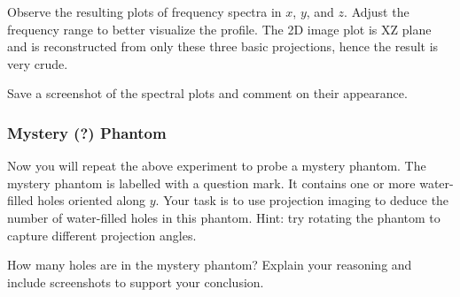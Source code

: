 Observe the resulting plots of frequency spectra in $x$, $y$, and $z$. Adjust the frequency range to better visualize the profile. The 2D image plot is XZ plane and is reconstructed from only these three basic projections, hence the result is very crude.

\noindent{}\color{red}
Save a screenshot of the spectral plots and comment on their appearance.
\color{black}

\subsubsection{Mystery (?) Phantom}
Now you will repeat the above experiment to probe a mystery phantom. The mystery phantom is labelled with a question mark. It contains one or more water-filled holes oriented along $y$. Your task is to use projection imaging to deduce the number of water-filled holes in this phantom. Hint: try rotating the phantom to capture different projection angles.

\noindent{}\color{red}
How many holes are in the mystery phantom? Explain your reasoning and include screenshots to support your conclusion. 
\color{black}